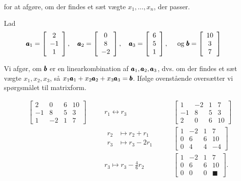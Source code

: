 for at afgøre, om der findes et sæt vægte $x_1, \ldots, x_n$, der passer.

\begin{example} Lad
\[
\begin{aligned}
&\pmb{a}_1=\left[\begin{array}{c}
2 \\
-1 \\
1
\end{array}\right], \quad \pmb{a}_2=\left[\begin{array}{c}
0 \\
8 \\
-2
\end{array}\right], \quad \pmb{a}_3=\left[\begin{array}{l}
6 \\
5 \\
1
\end{array}\right], \quad \text { og } \pmb{b}=\left[\begin{array}{c}
10 \\
3 \\
7
\end{array}\right]
\end{aligned}
\]

Vi afgør, om $\pmb{b}$ er en linearkombination af $\pmb{a}_1, \pmb{a}_2, \pmb{a}_3$, dvs. om der findes et sæt vægte $x_1, x_2, x_3$, så $x_1 \pmb{a}_1 + x_2 \pmb{a}_2 + x_3 \pmb{a}_3 = \pmb{b}$. Ifølge ovenstående oversætter vi spørgsmålet til matrixform.

\[
\begin{alignedat}{3}
& \left[\begin{array}{cccc}
2 & 0 & 6 & 10 \\
-1 & 8 & 5 & 3 \\
1 & -2 & 1 & 7
\end{array}\right]
& \quad & r_1 \leftrightarrow r_3 
& \quad & 
\left[\begin{array}{cccc}
1 & -2 & 1 & 7 \\
-1 & 8 & 5 & 3 \\
2 & 0 & 6 & 10
\end{array}\right] \\[10pt]
& & \quad & \begin{aligned}
    r_2 & \mapsto r_2 + r_1 \\
    r_3 & \mapsto r_3 - 2r_1
\end{aligned}
& \quad & 
\left[\begin{array}{cccc}
1 & -2 & 1 & 7 \\
0 & 6 & 6 & 10 \\
0 & 4 & 4 & -4
\end{array}\right] \\[10pt]
& & \quad & r_3 \mapsto r_3 - \frac{4}{6} r_2
& \quad & 
\left[\begin{array}{cccc}
1 & -2 & 1 & 7 \\
0 & 6 & 6 & 10 \\
0 & 0 & 0 & \blacksquare
\end{array}\right] .
\end{alignedat}
\]


\end{example}
